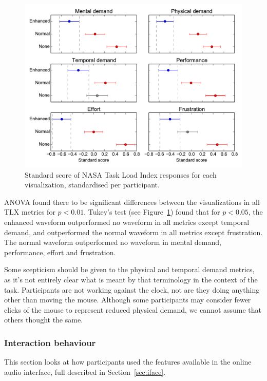 \begin{figure}[p]
  \centering
  \includegraphics[width=\textwidth]{figs/tlx-std-tukey95.pdf}
  \caption{Standard score of NASA Task Load Index responses for each
    visualization, standardised per participant.}
  \label{fig:tlxtukey}
\end{figure}

ANOVA found there to be significant differences between the visualizations in
all TLX metrics for $p < 0.01$. Tukey's test (see Figure~\ref{fig:tlxtukey})
found that for $p < 0.05$, the enhanced waveform outperformed no waveform in
all metrics except temporal demand, and outperformed the normal waveform in
all metrics except frustration. The normal waveform outperformed no waveform in
mental demand, performance, effort and frustration.

Some scepticism should be given to the physical and temporal demand metrics, as
it's not entirely clear what is meant by that terminology in the context of the
task. Participants are not working against the clock, not are they doing
anything other than moving the mouse. Although some participants may consider
fewer clicks of the mouse to represent reduced physical demand, we cannot
assume that others thought the same.

\subsubsection{Interaction behaviour}
This section looks at how participants used the features available in the
online audio interface, full described in Section~\ref{sec:iface}.

